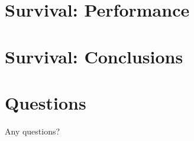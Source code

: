 \documentclass{beamer}
\begin{document}
\section{Survival: Performance}
\begin{frame}
  
  
\end{frame}

\section{Survival: Conclusions}
\begin{frame}
  
\end{frame}

\section{Questions}
\begin{frame}
\centering
  
  {\Huge Any questions?}


\end{frame}
\end{document}
